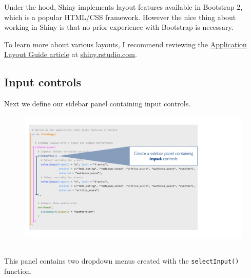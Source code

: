 \documentclass[
  letterpaper,
  DIV=11,
  numbers=noendperiod]{scrreprt}
\begin{document}
Under the hood, Shiny implements layout features available in Bootstrap
2, which is a popular HTML/CSS framework. However the nice thing about
working in Shiny is that no prior experience with Bootstrap is
necessary.

To learn more about various layouts, I recommend reviewing the
\href{https://shiny.rstudio.com/articles/layout-guide.html}{Application
Layout Guide article} at \url{shiny.rstudio.com}.

\hypertarget{input-controls}{%
\subsection{Input controls}\label{input-controls}}

Next we define our sidebar panel containing input controls.

\begin{figure}

{\centering \includegraphics[width=1\textwidth,height=\textheight]{./images/input-controls.png}

}

\end{figure}

\hypertarget{section-4}{%
\subsection{}\label{section-4}}

This panel contains two dropdown menus created with the
\texttt{selectInput()} function.
\end{document}
